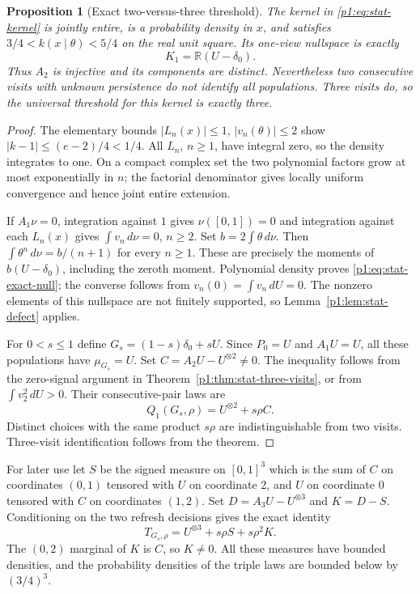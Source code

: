 \documentclass[11pt,a4paper]{article}
\newtheorem{proposition}[theorem]{Proposition}
\theoremstyle{definition}
\theoremstyle{remark}
\numberwithin{equation}{section}
\begin{document}
\begin{proposition}[Exact two-versus-three threshold]
\label{p1:prop:stat-sharp-visits}
The kernel in \eqref{p1:eq:stat-kernel} is jointly entire, is a probability
density in $x$, and satisfies $3/4<k(x\mid\theta)<5/4$ on the real unit
square.  Its one-view nullspace is exactly
\begin{equation}\label{p1:eq:stat-exact-null}
                 K_1=\mathbb R(U-\delta_0).
\end{equation}
Thus $A_2$ is injective and its components are distinct.  Nevertheless two
consecutive visits with unknown persistence do not identify all populations.
Three visits do, so the universal threshold for this kernel is exactly three.
\end{proposition}
\begin{proof}
The elementary bounds $|L_n(x)|\le1$, $|v_n(\theta)|\le2$ show
$|k-1|\le(e-2)/4<1/4$.  All $L_n$, $n\ge1$, have integral zero, so the
density integrates to one.  On a compact complex set the two polynomial
factors grow at most exponentially in $n$; the factorial denominator gives
locally uniform convergence and hence joint entire extension.

If $A_1\nu=0$, integration against $1$ gives $\nu([0,1])=0$ and integration
against each $L_n(x)$ gives $\int v_n\,d\nu=0$, $n\ge2$.  Set
$b=2\int\theta\,d\nu$.  Then $\int\theta^n\,d\nu=b/(n+1)$ for every
$n\ge1$.  These are precisely the moments of $b(U-\delta_0)$, including
the zeroth moment.  Polynomial density proves \eqref{p1:eq:stat-exact-null};
the converse follows from $v_n(0)=\int v_n\,dU=0$.  The nonzero elements of
this nullspace are not finitely supported, so Lemma~\ref{p1:lem:stat-defect}
applies.

For $0<s\le1$ define $G_s=(1-s)\delta_0+sU$.  Since $P_0=U$ and $A_1U=U$,
all these populations have $\mu_{G_s}=U$.  Set
$C=A_2U-U^{\otimes2}\ne0$.  The inequality follows from the zero-signal
argument in Theorem~\ref{p1:thm:stat-three-visits}, or from
$\int v_2^2\,dU>0$.  Their consecutive-pair laws are
\begin{equation}\label{p1:eq:stat-pair-confounding}
                Q_1(G_s,\rho)=U^{\otimes2}+s\rho C.
\end{equation}
Distinct choices with the same product $s\rho$ are indistinguishable from
two visits.  Three-visit identification follows from the theorem.
\end{proof}

For later use let $S$ be the signed measure on $[0,1]^3$ which is the sum
of $C$ on coordinates $(0,1)$ tensored with $U$ on coordinate $2$, and
$U$ on coordinate $0$ tensored with $C$ on coordinates $(1,2)$.  Set
$D=A_3U-U^{\otimes3}$ and $K=D-S$.  Conditioning on the two refresh
decisions gives the exact identity
\begin{equation}\label{p1:eq:stat-triple-expansion}
       T_{G_s,\rho}=U^{\otimes3}+s\rho S+s\rho^2K.
\end{equation}
The $(0,2)$ marginal of $K$ is $C$, so $K\ne0$.  All these measures have
bounded densities, and the probability densities of the triple laws are
bounded below by $(3/4)^3$.
\end{document}
